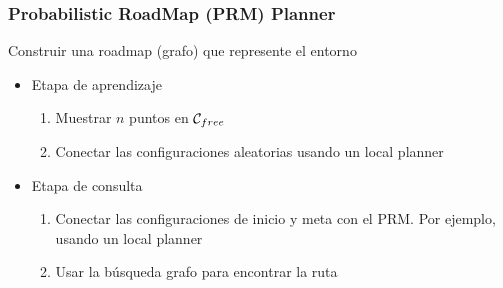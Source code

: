 \begin{frame}
	\frametitle{Probabilistic RoadMap (PRM) Planner}
	
	Construir una roadmap (grafo) que represente el entorno
	\begin{itemize}
		\item Etapa de aprendizaje
		\begin{enumerate}
			\item Muestrar $n$ puntos en $\mathcal{C}_{free}$
			\item Conectar las configuraciones aleatorias usando un local planner
		\end{enumerate}
		\item Etapa de consulta
		\begin{enumerate}
			\item Conectar las configuraciones de inicio y meta con el PRM. Por ejemplo, usando un local planner
			\item Usar la búsqueda grafo para encontrar la ruta
		\end{enumerate}
	\end{itemize}
\end{frame}


